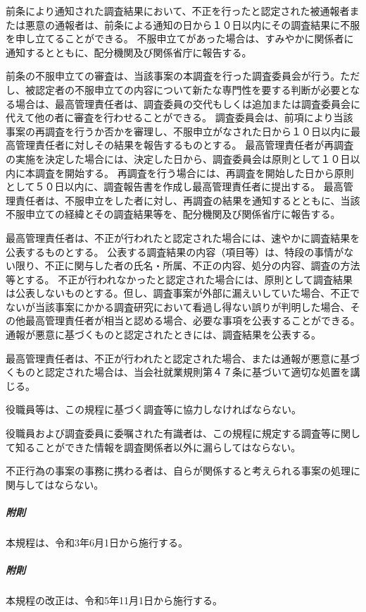 \documentclass[10pt,a4paper,uplatex]{jsarticle}
\begin{document}
前条により通知された調査結果において、不正を行ったと認定された被通報者または悪意の通報者は、前条による通知の日から１０日以内にその調査結果に不服を申し立てることができる。
\term 不服申立てがあった場合は、すみやかに関係者に通知するとともに、配分機関及び関係省庁に報告する。

前条の不服申立ての審査は、当該事案の本調査を行った調査委員会が行う。ただし、被認定者の不服申立ての内容について新たな専門性を要する判断が必要となる場合は、最高管理責任者は、調査委員の交代もしくは追加または調査委員会に代えて他の者に審査を行わせることができる。
\term 調査委員会は、前項により当該事案の再調査を行うか否かを審理し、不服申立がなされた日から１０日以内に最高管理責任者に対しその結果を報告するものとする。
\term 最高管理責任者が再調査の実施を決定した場合には、決定した日から、調査委員会は原則として１０日以内に本調査を開始する。
\term 再調査を行う場合には、再調査を開始した日から原則として５０日以内に、調査報告書を作成し最高管理責任者に提出する。
\term 最高管理責任者は、不服申立をした者に対し、再調査の結果を通知するとともに、当該不服申立ての経緯とその調査結果等を、配分機関及び関係省庁に報告する。

最高管理責任者は、不正が行われたと認定された場合には、速やかに調査結果を公表するものとする。
\term 公表する調査結果の内容（項目等）は、特段の事情がない限り、不正に関与した者の氏名・所属、不正の内容、処分の内容、調査の方法等とする。
\term 不正が行われなかったと認定された場合には、原則として調査結果は公表しないものとする。但し、調査事案が外部に漏えいしていた場合、不正でないが当該事案にかかる調査研究において看過し得ない誤りが判明した場合、その他最高管理責任者が相当と認める場合、必要な事項を公表することができる。
\term 通報が悪意に基づくものと認定されたときには、調査結果を公表する。

最高管理責任者は、不正が行われたと認定された場合、または通報が悪意に基づくものと認定された場合は、当会社就業規則第４７条に基づいて適切な処置を講じる。

役職員等は、この規程に基づく調査等に協力しなければならない。

役職員および調査委員に委嘱された有識者は、この規程に規定する調査等に関して知ることができた情報を調査関係者以外に漏らしてはならない。

不正行為の事案の事務に携わる者は、自らが関係すると考えられる事案の処理に関与してはならない。
\\

\subparagraph{附則}本規程は、令和3年6月1日から施行する。
\subparagraph{附則}本規程の改正は、令和5年11月1日から施行する。
\end{document}
